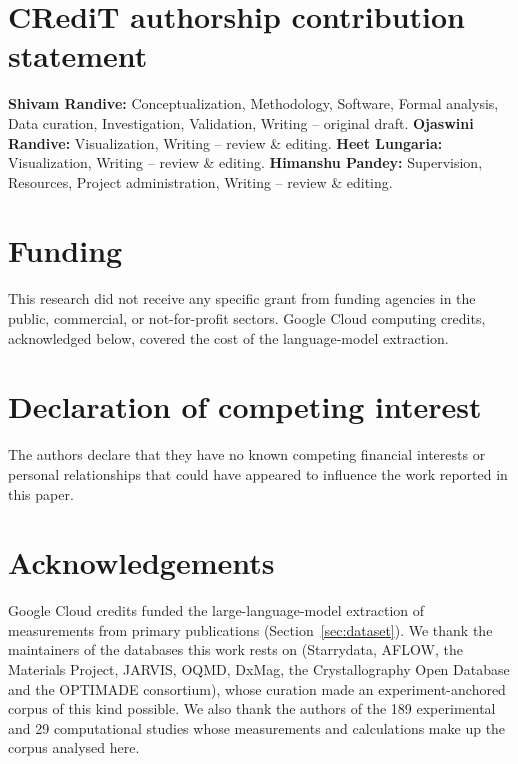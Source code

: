 \documentclass[preprint,12pt]{elsarticle}
\newcommand{\acknowledgementtext}{%
  Google Cloud credits funded the large-language-model extraction of measurements from primary
  publications (Section~\ref{sec:dataset}). We thank the maintainers of the databases this work
  rests on (Starrydata, AFLOW, the Materials Project, JARVIS, OQMD, DxMag, the Crystallography Open
  Database and the OPTIMADE consortium), whose curation made an experiment-anchored corpus of this
  kind possible. We also thank the authors of the \num{189} experimental and \num{29} computational
  studies whose measurements and calculations make up the corpus analysed here.}
\begin{document}
\section*{CRediT authorship contribution statement}

\textbf{Shivam Randive:} Conceptualization, Methodology, Software, Formal analysis,
Data curation, Investigation, Validation, Writing -- original draft.
\textbf{Ojaswini Randive:} Visualization, Writing -- review \& editing.
\textbf{Heet Lungaria:} Visualization, Writing -- review \& editing.
\textbf{Himanshu Pandey:} Supervision, Resources, Project administration,
Writing -- review \& editing.

\section*{Funding}

This research did not receive any specific grant from funding agencies in the public, commercial,
or not-for-profit sectors. Google Cloud computing credits, acknowledged below, covered the cost of
the language-model extraction.

\section*{Declaration of competing interest}

The authors declare that they have no known competing financial interests or personal relationships
that could have appeared to influence the work reported in this paper.


\section*{Acknowledgements}

\acknowledgementtext

\setlength{\bibsep}{0.6pt plus 0.3pt}


\end{document}

